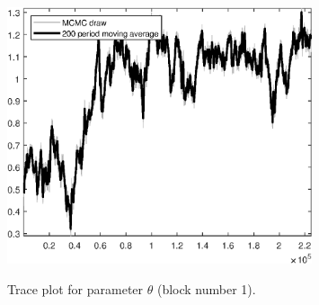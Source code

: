 \begin{figure}[H]
\centering
  \includegraphics[width=0.8\textwidth]{BRS_sectoral/graphs/TracePlot_theta_blck_1}\\
    \caption{Trace plot for parameter ${\theta}$ (block number 1).}
\end{figure}
